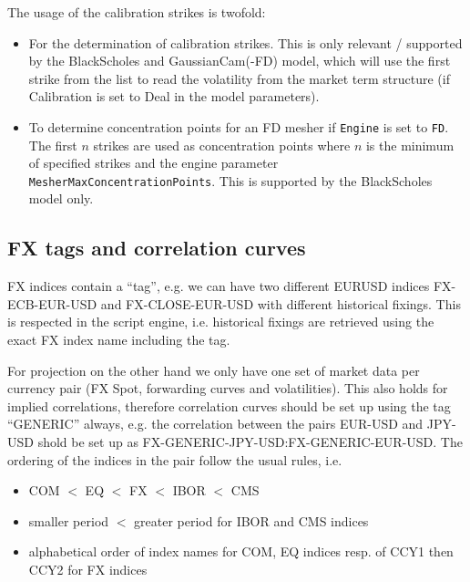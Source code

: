 The usage of the calibration strikes is twofold:

\begin{itemize}
\item For the determination of calibration strikes. This is only relevant / supported by the BlackScholes and
  GaussianCam(-FD) model, which will use the first strike from the list to read the volatility from the market term
  structure (if Calibration is set to Deal in the model parameters).
\item To determine concentration points for an FD mesher if \verb+Engine+ is set to \verb+FD+. The first $n$ strikes are
  used as concentration points where $n$ is the minimum of specified strikes and the engine parameter
  \verb+MesherMaxConcentrationPoints+. This is supported by the BlackScholes model only.
\end{itemize}

\subsection{FX tags and correlation curves}\label{fxtags_correlationcurves}

FX indices contain a ``tag'', e.g. we can have two different EURUSD indices FX-ECB-EUR-USD and FX-CLOSE-EUR-USD with
different historical fixings. This is respected in the script engine, i.e. historical fixings are retrieved using the
exact FX index name including the tag.

For projection on the other hand we only have one set of market data per currency pair (FX Spot, forwarding curves and
volatilities). This also holds for implied correlations, therefore correlation curves should be set up using the tag
``GENERIC'' always, e.g. the correlation between the pairs EUR-USD and JPY-USD shold be set up as
FX-GENERIC-JPY-USD:FX-GENERIC-EUR-USD. The ordering of the indices in the pair follow the usual rules, i.e.

\begin{itemize}
\item COM $<$ EQ $<$ FX $<$ IBOR $<$ CMS
\item smaller period $<$ greater period for IBOR and CMS indices
\item alphabetical order of index names for COM, EQ indices resp. of CCY1 then CCY2 for FX indices
\end{itemize}
